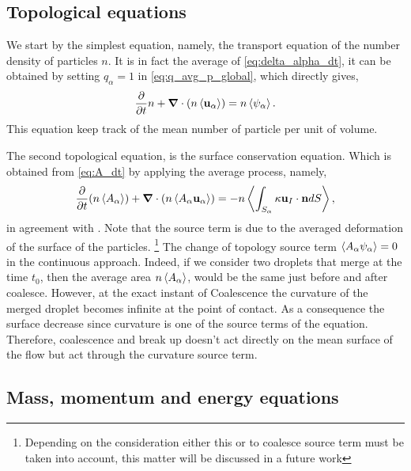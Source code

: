 \subsection{Topological equations}
We start by the simplest equation, namely, the transport equation of the number density of particles $n$. 
It is in fact the average of \ref{eq:delta_alpha_dt}, it can be obtained by setting $q_\alpha = 1$ in \ref{eq:q_avg_p_global}, which directly gives, 
\begin{equation}
    \frac{\partial}{\partial t} n 
    + \bm{\nabla} \cdot \left(
        n \left<\textbf{u}_\alpha\right>
    \right) 
    = n \left<\psi_\alpha\right>.
    \label{eq:avg_p_n}
\end{equation}
This equation keep track of the mean number of particle per unit of volume.

The second topological equation, is the surface conservation equation. 
Which is obtained from \ref{eq:A_dt} by applying the average process, namely, 
\begin{equation}
    \frac{\partial}{\partial t} (n \left<A_\alpha\right>)
    + \bm{\nabla}\cdot(n \left<A_\alpha \textbf{u}_\alpha\right>)
    = - n \left<\int_{S_\alpha} \kappa \textbf{u}_I \cdot \textbf{n} dS\right>,
    \label{eq:A_avg_p}
\end{equation}
in agreement with \citet{lhuillier2000bilan,lhuillier2003dynamics}.
Note that the source term is due to the averaged deformation of the surface of the particles.
\footnote{Depending on the consideration either this or to coalesce source term must be taken into account, this matter will be discussed in a future work} 
The change of topology source term $\left<A_\alpha \psi_\alpha\right> = 0$ in the continuous approach. 
Indeed, if we consider two droplets that merge at the time $t_0$, then the average area $n \left<A_\alpha\right>$, would be the same just before and after coalesce.
However, at the exact instant of Coalescence the curvature of the merged droplet becomes infinite at the point of contact.
As a consequence the surface decrease since curvature is one of the source terms of the equation. 
Therefore, coalescence and break up doesn't act directly on the mean surface of the flow but act through the curvature source term. 

\subsection{Mass, momentum and energy equations}

